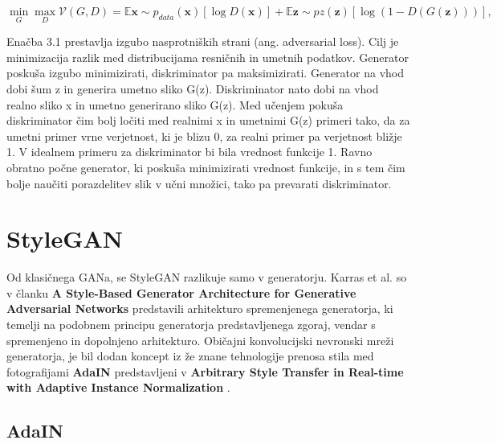 \documentclass[a4paper,12pt,openright]{book}
\begin{document}
\begin{equation}
\min_{G}\max_{D} \mathcal{V}(G, D) = \mathbb{E}{\boldsymbol{x} \sim p_{data}(\boldsymbol{x})} [\log D(\boldsymbol{x})] + \mathbb{E}{\boldsymbol{z} \sim p{z}(\boldsymbol{z})} [\log (1 - D(G(\boldsymbol{z})))],
\end{equation}

Enačba 3.1 prestavlja izgubo nasprotniških strani (ang. adversarial loss). Cilj je minimizacija razlik med distribucijama resničnih in umetnih podatkov. Generator poskuša izgubo minimizirati, diskriminator pa maksimizirati. 
Generator na vhod dobi šum z in generira umetno sliko G(z). Diskriminator nato dobi na vhod realno sliko x in umetno generirano sliko G(z). Med učenjem pokuša diskriminator čim bolj ločiti med realnimi x in umetnimi G(z) primeri tako, da za umetni primer vrne verjetnost, ki je blizu 0, za realni primer pa verjetnost bližje 1. V idealnem primeru za diskriminator bi bila vrednost funkcije 1. Ravno obratno počne generator, ki poskuša minimizirati vrednost funkcije, in s tem čim bolje naučiti porazdelitev slik v učni množici, tako pa prevarati diskriminator.


\section{StyleGAN}
Od klasičnega GANa, se StyleGAN razlikuje samo v generatorju. Karras et al. so v članku \textbf{A Style-Based Generator Architecture for Generative Adversarial Networks} \cite{karras2019style} predstavili arhitekturo spremenjenega generatorja, ki temelji na podobnem principu generatorja predstavljenega zgoraj, vendar s spremenjeno in dopolnjeno arhitekturo. Običajni konvolucijski nevronski mreži generatorja, je bil dodan koncept iz že znane tehnologije prenosa stila med fotografijami \textbf{AdaIN} predstavljeni v \textbf{Arbitrary Style Transfer in Real-time with Adaptive Instance Normalization} \cite{huang2017adain}. 


\subsection{AdaIN}
\end{document}
